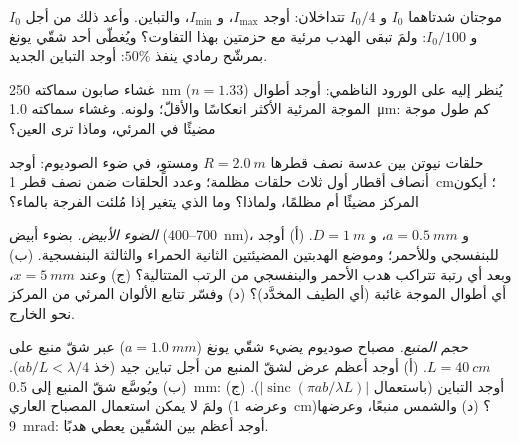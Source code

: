 \begin{exercise}[$\star$]\label{exo:b2:two-wave-interference:2}
موجتان شدتاهما $I_0$ و $I_0/4$ تتداخلان: أوجد $I_{\max}$، و $I_{\min}$،
والتباين. وأعد ذلك من أجل $I_0$ و $I_0/100$: ولمَ تبقى الهدب مرئية
مع حزمتين بهذا التفاوت؟ ويُغطّى أحد شقّي يونغ بمرشّح
رمادي ينفذ $50\%$: أوجد التباين الجديد.
\end{exercise}

\begin{exercise}[$\star$]\label{exo:b2:two-wave-interference:3}
غشاء صابون سماكته \qty{250}{nm} ($n = 1.33$) يُنظر إليه على الورود الناظمي:
أوجد أطوال الموجة المرئية الأكثر انعكاسًا والأقلّ؛ ولونه. وغشاء
سماكته \qty{1.0}{\micro m}: كم طول موجة مضيئًا في المرئي، وماذا
ترى العين؟
\end{exercise}

\begin{exercise}[$\star$]\label{exo:b2:two-wave-interference:4}
حلقات نيوتن بين عدسة نصف قطرها $R = \qty{2.0}{m}$ ومستوٍ، في
ضوء الصوديوم: أوجد أنصاف أقطار أول ثلاث حلقات مظلمة؛ وعدد الحلقات
ضمن نصف قطر \qty{1}{cm}؛ أيكون المركز مضيئًا أم مظلمًا، ولماذا؟
وما الذي يتغير إذا مُلئت الفرجة بالماء؟
\end{exercise}

\begin{exercise}[$\star\star$]\label{exo:b2:two-wave-interference:5}
\emph{الضوء الأبيض.}  بضوء أبيض ($400$--\qty{700}{nm})،
و $a = \qty{0.5}{mm}$، و $D = \qty{1}{m}$. (أ) أوجد  للبنفسجي وللأحمر؛
وموضع الهدبتين المضيئتين الثانية الحمراء والثالثة البنفسجية. (ب)
وبعد أي رتبة تتراكب هدب الأحمر والبنفسجي من الرتب المتتالية؟
(ج) وعند $x = \qty{5}{mm}$، أي أطوال الموجة غائبة
(أي الطيف المخدَّد)؟ (د) وفسّر تتابع الألوان المرئي من
المركز نحو الخارج.
\end{exercise}

\begin{exercise}[$\star\star$]\label{exo:b2:two-wave-interference:6}
\emph{حجم المنبع.} مصباح صوديوم يضيء شقّي يونغ ($a = \qty{1.0}{mm}$)
عبر شقّ منبع على $L = \qty{40}{cm}$. (أ) أوجد أعظم عرض
لشقّ المنبع من أجل تباين جيد (خذ $ab/L < \lambda/4$). (ب) ويُوسَّع شقّ المنبع
إلى \qty{0.5}{mm}: أوجد التباين (باستعمال $|\operatorname{sinc}(\pi ab/\lambda L)|$).
(ج) ولمَ لا يمكن استعمال المصباح العاري (وعرضه \qty{1}{cm})؟ (د) والشمس
منبعًا، وعرضها \qty{9}{mrad}: أوجد أعظم  بين الشقّين يعطي
هدبًا.
\end{exercise}

